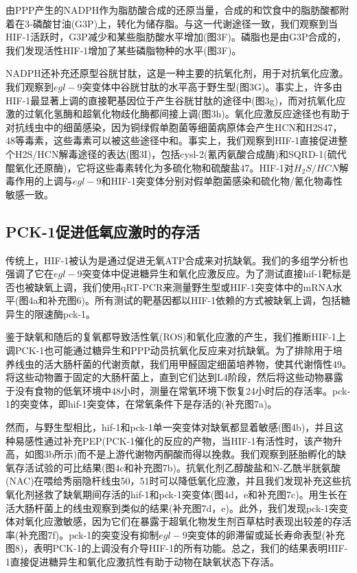 \documentclass{ctexart}
\begin{document}
        由PPP产生的NADPH作为脂肪酸合成的还原当量，合成的和饮食中的脂肪酸都附着在3-磷酸甘油(G3P)上，转化为储存脂。与这一代谢途径一致，我们观察到当HIF-1活跃时，G3P减少和某些脂肪酸水平增加(图3F)。磷脂也是由G3P合成的，我们发现活性HIF-1增加了某些磷脂物种的水平(图3F)。

        NADPH还补充还原型谷胱甘肽，这是一种主要的抗氧化剂，用于对抗氧化应激。我们观察到$egl-9$突变体中谷胱甘肽的水平高于野生型(图3G)。事实上，许多由HIF-1最显著上调的直接靶基因位于产生谷胱甘肽的途径中(图3g)，而对抗氧化应激的过氧化氢酶和超氧化物歧化酶都间接上调(图3h)。氧化应激反应途径也有助于对抗线虫中的细菌感染，因为铜绿假单胞菌等细菌病原体会产生HCN和H2S47，48等毒素，这些毒素可以被这些途径中和。事实上，我们观察到HIF-1直接促进整个H2S/HCN解毒途径的表达(图3I)，包括cysl-2(氰丙氨酸合成酶)和SQRD-1(硫代醌氧化还原酶)，它将这些毒素转化为多硫化物和硫酸盐47。HIF-1对$H_{2}S/HCN$解毒作用的上调与$egl-9$和HIF-1突变体分别对假单胞菌感染和硫化物/氰化物毒性敏感一致。

    \subsection{PCK-1促进低氧应激时的存活}

        传统上，HIF-1被认为是通过促进无氧ATP合成来对抗缺氧。我们的多组学分析也强调了它在$egl-9$突变体中促进糖异生和氧化应激反应。为了测试直接hif-1靶标是否也被缺氧上调，我们使用qRT-PCR来测量野生型或HIF-1突变体中的mRNA水平(图4a和补充图6)。所有测试的靶基因都以HIF-1依赖的方式被缺氧上调，包括糖异生的限速酶pck-1。

        鉴于缺氧和随后的复氧都导致活性氧(ROS)和氧化应激的产生，我们推断HIF-1上调PCK-1也可能通过糖异生和PPP动员抗氧化反应来对抗缺氧。为了排除用于培养线虫的活大肠杆菌的代谢贡献，我们用甲醛固定细菌培养物，使其代谢惰性49。将这些动物置于固定的大肠杆菌上，直到它们达到L4阶段，然后将这些动物暴露于没有食物的低氧环境中48小时，测量在常氧环境下恢复24小时后的存活率。pck-1的突变体，即hif-1突变体，在常氧条件下是存活的(补充图7a)。

        然而，与野生型相比，hif-1和pck-1单一突变体对缺氧都显着敏感(图4b)，并且这种易感性通过补充PEP(PCK-1催化的反应的产物，当HIF-1有活性时，该产物升高，如图3b所示)而不是上游代谢物丙酮酸而得以挽救。我们观察到胚胎孵化的缺氧存活试验的可比结果(图4c和补充图7b)。抗氧化剂乙醇酸盐和N-乙酰半胱氨酸(NAC)在喂给秀丽隐杆线虫50，51时可以降低氧化应激，并且我们发现补充这些抗氧化剂拯救了缺氧期间存活的hif-1和pck-1突变体(图4d，e和补充图7c)。用生长在活大肠杆菌上的线虫观察到类似的结果(补充图7d，e)。此外，我们发现pck-1突变体对氧化应激敏感，因为它们在暴露于超氧化物发生剂百草枯时表现出较差的存活率(补充图7f)。pck-1的突变没有抑制$egl-9$突变体的卵滞留或延长寿命表型(补充图8)，表明PCK-1的上调没有介导HIF-1的所有功能。总之，我们的结果表明HIF-1直接促进糖异生和氧化应激抗性有助于动物在缺氧状态下存活。
\end{document}
